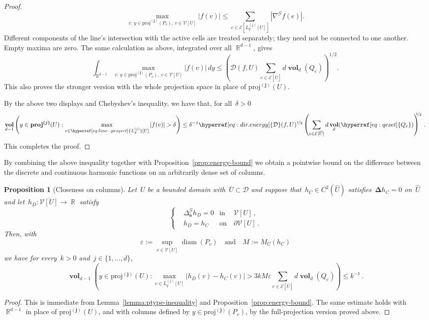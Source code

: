 \documentclass[12pt]{amsart}
\numberwithin{equation}{section}
\DeclareMathOperator{\R}{\mathbb{R}}
\DeclareMathOperator{\diam}{{\mathop{diam}}}
\newtheorem{prop}[theorem]{Proposition}
\newcommand{\V}{\mathcal{V}}
\newcommand{\E}{\mathcal{E}}
\newcommand{\eps}{\varepsilon}
\newcommand{\CLap}{\boldsymbol{\Delta}}
\newcommand{\projj}{\boldsymbol{\mathrm{proj}^{(j)}}}
\newcommand{\aDelta}{\hyperref[eq:geometric-laplacian]{{\Delta^{\mathcal{G}}_{\cond}}}}
\newcommand{\cond}{\hyperref[eq:geometric-laplacian]{\mathbf{a}}}
\newcommand{\D}{\hyperref[eq:dir.energy]{\mathcal{D}}}
\newcommand{\GCU}{\hyperref[eq:graph-closure]{\widehat{U}}}
\newcommand{\Qe}{\hyperref[eq:qeset]{Q_e}}
\newcommand{\Lyj}{\hyperref[eq:line-project]{L_y^{(j)}}}
\DeclareMathOperator{\vol}{\mathbf{vol}}
\begin{document}
\begin{proof}
        \[
        \max_{v:\,y\in\projj(P_v),\ v\in\V[U]}|f(v)|
        \leq\sum_{e\in\E[\Lyj[U]]}|\nabla^{\mathcal G}f(e)|.
        \]
        Different components of the line's intersection with the active cells are treated separately; they need not be connected to one another. Empty maxima are zero. The same calculation as above, integrated over all $\R^{d-1}$, gives
        \[
        \int_{\R^{d-1}}\max_{v:\,y\in\projj(P_v),\ v\in\V[U]}|f(v)|\,dy
        \leq\left(\D(f,U)\sum_{e\in\E[\overline U]}d\vol_d(Q_e)\right)^{1/2}.
        \]
        This also proves the stronger version with the whole projection space in place of $\projj(U)$.

By the above two displays and Chebyshev's inequality, we have that, for all~$\delta> 0$
	\[
	\vol_{d-1} \left( y \in \projj(U): \max_{v \in \Lyj[U]} |f(v)| > \delta \right) \leq \delta^{-1}  \D(f,U)^{\nicefrac12}   \left( \sum_{e \in \E[\overline{U}]} d   \vol_{d}(\Qe)  \right)^{\! \!  \! \!\nicefrac12}  \, . 
	\]
	This completes the proof. 
\end{proof}



By combining the above inequality together with Proposition~\ref{prop:energy-bound} we obtain a pointwise bound on the 
difference between the discrete and continuous harmonic functions on an arbitrarily dense set of columns. 
\begin{prop}[Closeness on columns]
	\label{prop:energy-poincare-bound}
	Let~$U$ be a bounded domain with~$\overline{U} \subset \mathcal{D}$ and suppose that~$h_C \in C^{2}(\GCU)$ satisfies~$\CLap h_C = 0$ on~$\GCU$ and let~$h_D: \overline{\V[U]} \to \R$ satisfy 
	\[
	\left\{
	\begin{aligned}
		&  \aDelta h_D = 0 & \mbox{in} & \ \V[U] \,,
		\\
		& h_D = h_C & \mbox{on} & \  \partial \V[U] \, . 
	\end{aligned}
	\right.
	\]
	Then, with
	\[
	\eps := \sup_{v \in \overline{\V[U]}} \diam(P_v)
	\quad \mbox{and} \quad M := M_U(h_C)
	\]
	we have for every~$k > 0$ and~$j \in \{1, \ldots, d\}$,
	\[
	\vol_{d-1} \left( y \in \projj(U): \max_{v \in \Lyj[U]} |h_D(v) - h_C(v)| > 3 k M \eps \sum_{e \in \E[\overline{U}]} d   \vol_{d}(\Qe)  \right) \leq k^{-1}  \, . 
	\]
\end{prop}
\begin{proof}
	This is immediate from Lemma~\ref{lemma:ptype-inequality} and Proposition~\ref{prop:energy-bound}. The same estimate holds with $\R^{d-1}$ in place of $\projj(U)$, and with columns defined by $y\in\projj(P_v)$, by the full-projection version proved above. 
\end{proof}
\end{document}
